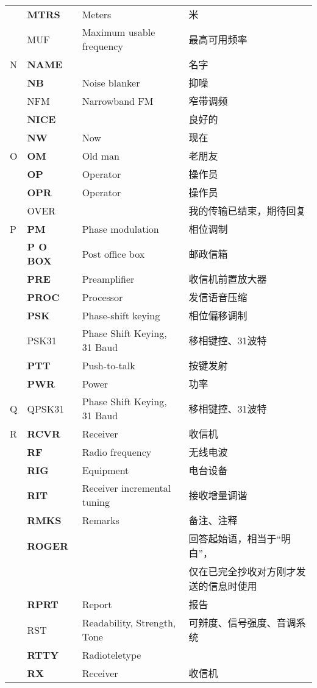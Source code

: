 \begin{longtable}[l]{llll}
& \textbf{MTRS} & Meters & 米 \\
& MUF & Maximum usable frequency & 最高可用频率 \\
N & \textbf{NAME} & & 名字 \\
& \textbf{NB} & Noise blanker & 抑噪 \\
& NFM & Narrowband FM & 窄带调频 \\
& \textbf{NICE} & & 良好的 \\
& \textbf{NW} & Now & 现在 \\
O & \textbf{OM} & Old man & 老朋友 \\%
& \textbf{OP} & Operator & 操作员 \\
& \textbf{OPR} & Operator & 操作员 \\
& OVER & & 我的传输已结束，期待回复 \\
P & \textbf{PM} & Phase modulation & 相位调制 \\
& \textbf{P O BOX} & Post office box & 邮政信箱 \\
& \textbf{PRE} & Preamplifier & 收信机前置放大器 \\
& \textbf{PROC} & Processor & 发信语音压缩 \\
& \textbf{PSK} & Phase-shift keying & 相位偏移调制 \\
& PSK31 & Phase Shift Keying, 31 Baud & 移相键控、31波特 \\
& \textbf{PTT} & Push-to-talk & 按键发射 \\
& \textbf{PWR} & Power & 功率 \\
Q & QPSK31 & Phase Shift Keying, 31 Baud & 移相键控、31波特 \\
R & \textbf{RCVR} & Receiver & 收信机 \\
& \textbf{RF} & Radio frequency & 无线电波 \\
& \textbf{RIG} & Equipment & 电台设备 \\
& \textbf{RIT} & Receiver incremental tuning & 接收增量调谐 \\
& \textbf{RMKS} & Remarks & 备注、注释 \\
& \textbf{ROGER} & & 回答起始语，相当于“明白”， \\
& &  & 仅在已完全抄收对方刚才发送的信息时使用 \\
& \textbf{RPRT} & Report & 报告 \\
& RST & Readability, Strength, Tone & 可辨度、信号强度、音调系统 \\
& \textbf{RTTY} & Radioteletype & \\
& \textbf{RX} & Receiver & 收信机 \\

\end{longtable}
